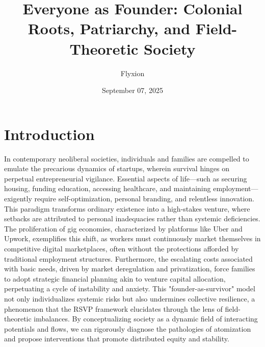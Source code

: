 \documentclass[11pt]{article}
\title{Everyone as Founder: Colonial Roots, Patriarchy, and Field-Theoretic Society}
\author{Flyxion}
\date{September 07, 2025}
\begin{document}
\maketitle

\section{Introduction}

In contemporary neoliberal societies, individuals and families are compelled to emulate the precarious dynamics of startups, wherein survival hinges on perpetual entrepreneurial vigilance. Essential aspects of life—such as securing housing, funding education, accessing healthcare, and maintaining employment—exigently require self-optimization, personal branding, and relentless innovation. This paradigm transforms ordinary existence into a high-stakes venture, where setbacks are attributed to personal inadequacies rather than systemic deficiencies. The proliferation of gig economies, characterized by platforms like Uber and Upwork, exemplifies this shift, as workers must continuously market themselves in competitive digital marketplaces, often without the protections afforded by traditional employment structures. Furthermore, the escalating costs associated with basic needs, driven by market deregulation and privatization, force families to adopt strategic financial planning akin to venture capital allocation, perpetuating a cycle of instability and anxiety. This "founder-as-survivor" model not only individualizes systemic risks but also undermines collective resilience, a phenomenon that the RSVP framework elucidates through the lens of field-theoretic imbalances. By conceptualizing society as a dynamic field of interacting potentials and flows, we can rigorously diagnose the pathologies of atomization and propose interventions that promote distributed equity and stability.
\end{document}
